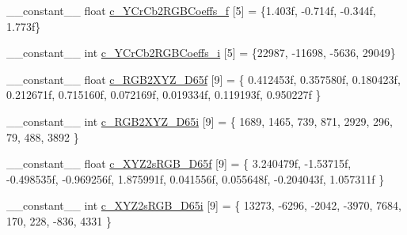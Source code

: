 \begin{DoxyCompactItemize}
\item 
\-\_\-\-\_\-constant\-\_\-\-\_\- float \hyperlink{namespacecv_1_1gpu_1_1device_1_1color__detail_ae6f46dc891123b2b127c4af9fe8867d4}{c\-\_\-\-Y\-Cr\-Cb2\-R\-G\-B\-Coeffs\-\_\-f} \mbox{[}5\mbox{]} = \{1.\-403f, -\/0.\-714f, -\/0.\-344f, 1.\-773f\}
\item 
\-\_\-\-\_\-constant\-\_\-\-\_\- int \hyperlink{namespacecv_1_1gpu_1_1device_1_1color__detail_a618b643b2dcf720985d8b4e1b67e8790}{c\-\_\-\-Y\-Cr\-Cb2\-R\-G\-B\-Coeffs\-\_\-i} \mbox{[}5\mbox{]} = \{22987, -\/11698, -\/5636, 29049\}
\item 
\-\_\-\-\_\-constant\-\_\-\-\_\- float \hyperlink{namespacecv_1_1gpu_1_1device_1_1color__detail_adb6f9f66aa831e69e6cd0fe39edaa77c}{c\-\_\-\-R\-G\-B2\-X\-Y\-Z\-\_\-\-D65f} \mbox{[}9\mbox{]} = \{ 0.\-412453f, 0.\-357580f, 0.\-180423f, 0.\-212671f, 0.\-715160f, 0.\-072169f, 0.\-019334f, 0.\-119193f, 0.\-950227f \}
\item 
\-\_\-\-\_\-constant\-\_\-\-\_\- int \hyperlink{namespacecv_1_1gpu_1_1device_1_1color__detail_aba86e885f91ae8aefc51ee703cd1361f}{c\-\_\-\-R\-G\-B2\-X\-Y\-Z\-\_\-\-D65i} \mbox{[}9\mbox{]} = \{ 1689, 1465, 739, 871, 2929, 296, 79, 488, 3892 \}
\item 
\-\_\-\-\_\-constant\-\_\-\-\_\- float \hyperlink{namespacecv_1_1gpu_1_1device_1_1color__detail_a067fa5d09da16d205180ae47bedaa98b}{c\-\_\-\-X\-Y\-Z2s\-R\-G\-B\-\_\-\-D65f} \mbox{[}9\mbox{]} = \{ 3.\-240479f, -\/1.\-53715f, -\/0.\-498535f, -\/0.\-969256f, 1.\-875991f, 0.\-041556f, 0.\-055648f, -\/0.\-204043f, 1.\-057311f \}
\item 
\-\_\-\-\_\-constant\-\_\-\-\_\- int \hyperlink{namespacecv_1_1gpu_1_1device_1_1color__detail_ae0db03981151682f94eadca3780cf813}{c\-\_\-\-X\-Y\-Z2s\-R\-G\-B\-\_\-\-D65i} \mbox{[}9\mbox{]} = \{ 13273, -\/6296, -\/2042, -\/3970, 7684, 170, 228, -\/836, 4331 \}
\item 

\end{DoxyCompactItemize}
